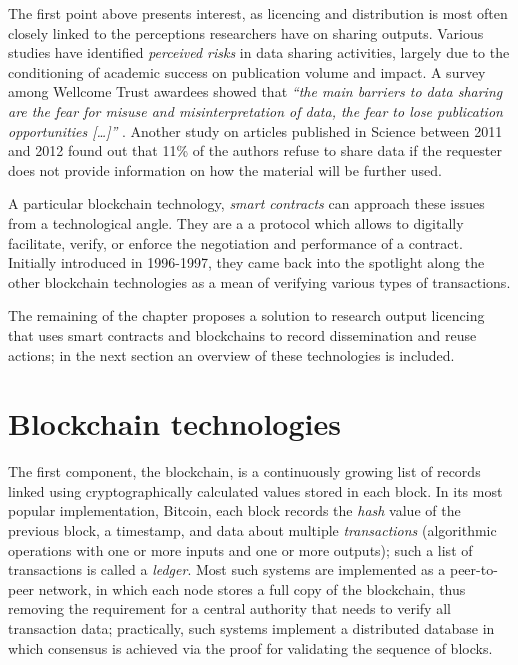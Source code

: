 The first point above presents interest, as licencing and distribution is most often closely linked to the perceptions researchers have on sharing outputs. Various studies \cite{federer,kim} have identified \emph{perceived risks} in data sharing activities, largely due to the conditioning of academic success on publication volume and impact. A survey among Wellcome Trust awardees showed that \emph{``the main barriers to data sharing are  the fear for misuse and misinterpretation of data, the fear to lose publication opportunities [\ldots]''} \cite{wellcome}. Another study on articles published in Science between 2011 and 2012 found out that 11\% of the authors refuse to share data if the requester does not provide information on how the material will be further used\cite{stodden}.

A particular blockchain technology, \emph{smart contracts} can approach these issues from a technological angle. They are a a protocol which allows to digitally facilitate, verify, or enforce the negotiation and performance of a contract. Initially introduced in 1996-1997\cite{szabo}, they came back into the spotlight along the other blockchain technologies as a mean of verifying various types of transactions. 

The remaining of the chapter proposes a solution to research output licencing that uses smart contracts and blockchains to record dissemination and reuse actions; in the next section an overview of these technologies is included.

\section{Blockchain technologies}
\label{sec:blockchain}

The first component, the blockchain, is a continuously growing list of records linked using cryptographically calculated values stored in each block. In its most popular implementation, Bitcoin, each block records the \emph{hash} value of the previous block, a timestamp, and data about multiple \emph{transactions} (algorithmic operations with one or more inputs and one or more outputs); such a list of transactions is called a \emph{ledger}. Most such systems are implemented as a peer-to-peer network, in which each node stores a full copy of the blockchain, thus removing the requirement for a central authority that needs to verify all transaction data; practically, such systems implement a distributed database in which consensus is achieved via the proof for validating the sequence of blocks.

